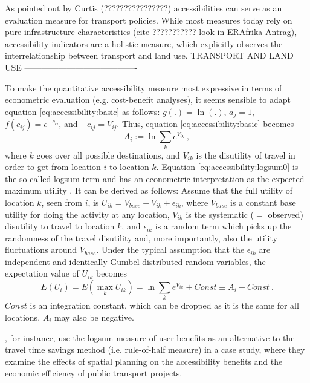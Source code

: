 As pointed out by Curtis (????????????????) accessibilities can serve as an evaluation measure for transport 
policies. While most measures today rely on pure infrastructure characteristics (cite ??????????? look in ERAfrika-Antrag), 
accessibility indicators are a holistic measure, which explicitly observes the interrelationship between transport and land use.
TRANSPORT AND LAND USE ----------------------------------------

To make the quantitative accessibility measure most expressive in terms of econometric evaluation (e.g. cost-benefit 
analyses), it seems sensible to adapt equation \ref{eq:accessibility:basic} as 
follows: $g(.) = \ln(.)$, $a_j = 1$, $f(c_{ij}) = e^{-c_{ij}}$, and $-c_{ij} = V_{ij}$. Thus, 
equation \ref{eq:accessibility:basic} becomes
\begin{equation}
	A_i := \ln \sum_k e^{V_{ik}} \ ,
	\label{eq:accessibility:logsum0}
\end{equation}
where $k$ goes over all possible destinations, and $V_{ik}$ is the
disutility of travel in order to get from location $i$ to location
$k$. Equation \ref{eq:accessibility:logsum0} is the so-called logsum term and has an econometric interpretation 
as the expected maximum utility \citep[e.g.][]{Ben-AkivaBook}. It can be derived as follows: Assume that the full 
utility of location $k$, seen from $i$, is $U_{ik} = V_{base} + V_{ik} + \epsilon_{ik}$, where $V_{base}$ is a constant 
base utility for doing the activity at any location, $V_{ik}$ is the systematic ($=$ observed) disutility to travel to 
location $k$, and $\epsilon_{ik}$ is a random term which picks up the randomness of the travel disutility and, more 
importantly, also the utility fluctuations around $V_{base}$.  Under the typical assumption that the $\epsilon_{ik}$ 
are independent and identically Gumbel-distributed random variables, the expectation value of $U_{ik}$ becomes
\begin{equation}
	E(U_i) = E(\max_k U_{ik}) = \ln \sum_k e^{V_{ik}} + Const \equiv A_i + Const \ .
\end{equation}
$Const$ is an integration constant, which can be dropped as it is the same for all locations. $A_i$ may also be negative.

\citet{GeuersEtAl20xx}, for instance, use the logsum measure of user benefits as an alternative to the travel time 
savings method (i.e. rule-of-half measure) in a case study, where they examine the effects of spatial planning on 
the accessibility benefits and the economic efficiency of public transport projects.

